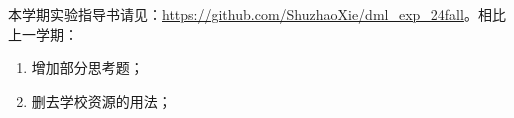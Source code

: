 

\hspace{2em} 本学期实验指导书请见：\url{https://github.com/ShuzhaoXie/dml_exp_24fall}。相比上一学期：
\begin{enumerate}
    \item 增加部分思考题；
    \item 删去学校资源的用法；
\end{enumerate}


\vspace{5em}



